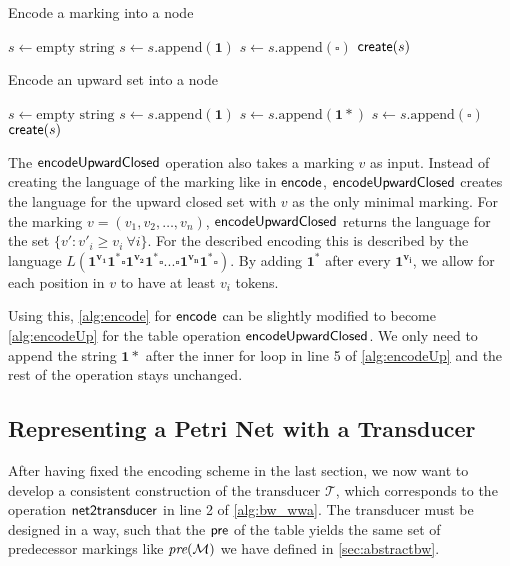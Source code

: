 \begin{minipage}{0.46\textwidth}
\begin{algorithm}[H]
\caption{Encode a marking into a node}\label{alg:encode}
\begin{algorithmic}[1]
\State $s \gets \text{empty string}$
\State $s \gets s.\text{append}(\bm{1})$
\EndFor
\State $s \gets s.\text{append}(\bm{\square})$
\EndFor
\Return $\operatorname{\textsf{create}} (s)$
\end{algorithmic}
\end{algorithm}
\end{minipage}
\hfill
\begin{minipage}{0.46\textwidth}
\begin{algorithm}[H]
\caption{Encode an upward set into a node}\label{alg:encodeUp}
\begin{algorithmic}[1]
\State $s \gets \text{empty string}$
\State $s \gets s.\text{append}(\bm{1})$
\EndFor
\State $s \gets s.\text{append}(\bm{1*})$
\State $s \gets s.\text{append}(\bm{\square})$
\EndFor
\Return $\operatorname{\textsf{create}} (s)$
\end{algorithmic}
\end{algorithm}
\end{minipage}

The $\operatorname{\textsf{encodeUpwardClosed}}$ operation also takes a marking $v$ as input. Instead of creating the language of the marking like in $\operatorname{\textsf{encode}}$, $\operatorname{\textsf{encodeUpwardClosed}}$ creates the language for the upward closed set with $v$ as the only minimal marking. For the marking $v=(v_{1},v_{2},\dots,v_{n})$, $\operatorname{\textsf{encodeUpwardClosed}}$ returns the language for the set $\{v': v'_{i} \ge v_{i} \ \forall i\}$. For the described encoding this is described by the language $L(\bm{1^{v_{1}} 1^{*} \square 1^{v_{2}} 1^{*} \square ... \square 1^{v_{n}} 1^{*} \square })$. By adding $\bm{1^{*}}$ after every $\bm{1^{v_{i}}}$, we allow for each position in $v$ to have at least $v_{i}$ tokens.

\par
Using this, \autoref{alg:encode} for $\operatorname{\textsf{encode}}$ can be slightly modified to become \autoref{alg:encodeUp} for the table operation $\operatorname{\textsf{encodeUpwardClosed}}$. We only need to append the string $\bm{1*}$ after the inner for loop in line 5 of \autoref{alg:encodeUp} and the rest of the operation stays unchanged. 

\subsection{Representing a Petri Net with a Transducer}
After having fixed the encoding scheme in the last section, we now want to develop a consistent construction  of the transducer $\mathcal{T}$, which corresponds to the operation $\operatorname{\textsf{net2transducer}}$ in line 2 of \autoref{alg:bw_wwa}. 
The transducer must be designed in a way, such that the $\operatorname{\textsf{pre}}$ of the table yields the same set of predecessor markings like $\operatorname{\textit{pre}}(\mathcal{M})$  we have defined in \autoref{sec:abstractbw}.

